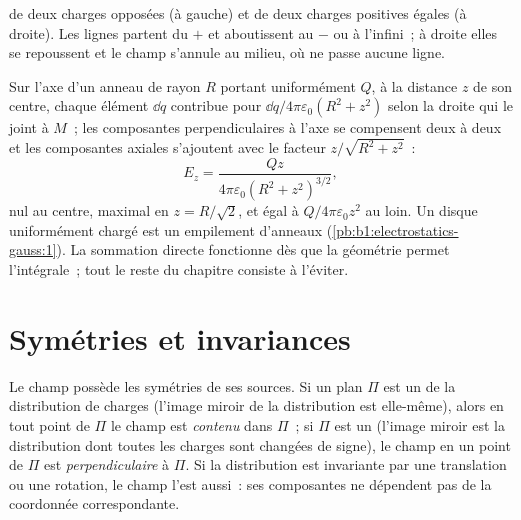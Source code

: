 \begin{omfigure}
{\small {} de deux charges opposées (à gauche) et de deux charges
positives égales (à droite). Les lignes partent du $+$ et aboutissent au $-$
ou à l'infini~; à droite elles se repoussent et le champ s'annule au milieu,
où ne passe aucune ligne.}
\end{omfigure}

\begin{example}\label{ex:b1:electrostatics-gauss:ring}
Sur l'axe d'un anneau de rayon $R$ portant uniformément $Q$, à la distance
$z$ de son centre, chaque élément $\dd q$ contribue pour $\dd q/4\pi\varepsilon_0(R^2 +
z^2)$ selon la droite qui le joint à $M$~; les composantes perpendiculaires
à l'axe se compensent deux à deux et les composantes axiales s'ajoutent avec
le facteur $z/\sqrt{R^2 + z^2}$~:
\[
E_z = \frac{Qz}{4\pi\varepsilon_0(R^2 + z^2)^{3/2}} ,
\]
nul au centre, maximal en $z = R/\sqrt2$, et égal à $Q/4\pi\varepsilon_0z^2$ au
loin. Un disque uniformément chargé est un empilement d'anneaux (\cref{pb:b1:electrostatics-gauss:1}).
La sommation directe fonctionne dès que la géométrie permet l'intégrale~; tout
le reste du chapitre consiste à l'éviter.
\end{example}

\section{Symétries et invariances}

\begin{proposition}\label{prop:b1:electrostatics-gauss:symmetry}
Le champ possède les symétries de ses sources. Si un plan $\Pi$ est un
\emph{} de la distribution de charges (l'image miroir de la
distribution est elle-même), alors en tout point de $\Pi$ le champ est
\emph{contenu} dans $\Pi$~; si $\Pi$ est un \emph{}
(l'image miroir est la distribution dont toutes les charges sont changées de
signe), le champ en un point de $\Pi$ est \emph{perpendiculaire} à $\Pi$. Si
la distribution est invariante par une translation ou une rotation, le champ
l'est aussi~: ses composantes ne dépendent pas de la coordonnée correspondante.
\end{proposition}

